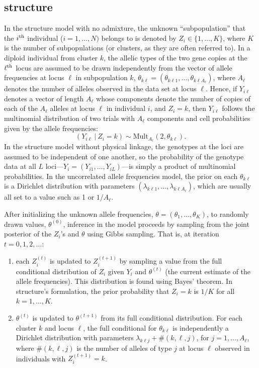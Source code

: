 \subsection*{{\sc structure}}
In the {\sc structure} model with no admixture, the unknown ``subpopulation'' that the 
$i^\mathrm{th}$ individual ($i=1,\ldots,N)$ belongs to is denoted by $Z_i \in \{1,\ldots,K\}$, 
where $K$ is the 
number of subpopulations (or clusters, as they are often referred to).  
In a diploid individual from cluster $k$, the 
allelic types of the two gene copies at the $\ell^\mathrm{th}$ locus are assumed
to be drawn independently from the vector of allele frequencies at
locus $\ell$ in subpopulation $k$,  $\theta_{k\ell}=(\theta_{k\ell 1},\ldots,\theta_{k\ell A_\ell})$, where 
$A_\ell$ 
denotes the number of alleles observed in the data set at locus $\ell$.
Hence, if $Y_{i\ell}$ denotes a vector of length $A_\ell$ whose components denote the 
number
of copies of each of the $A_\ell$ alleles at locus $\ell$ in individual $i$, and 
$Z_i=k$, then $Y_{i\ell}$ follows the multinomial distribution of two trials with
$A_\ell$  components and cell probabilities given by the allele frequencies: 
\begin{equation}
(Y_{i\ell}~|~Z_i=k) \sim \mathrm{Mult}_{A_\ell}(2, \theta_{k\ell}).
\end{equation}
In the {\sc structure} model without physical linkage, the genotypes at the loci are assumed to
be independent of one another, so the probability of the genotype data at
all $L$ loci---$Y_i=(Y_{i1},\ldots,Y_{iL})$---is simply a product of multinomial 
probabilities.
In the uncorrelated allele frequencies model, the prior on each $\theta_{k\ell}$ is a
Dirichlet distribution with parameters $(\lambda_{k\ell1},\ldots,\lambda_{k\ell A_
\ell})$,
which are usually all set to a value such as 1 or $1/A_\ell$.  

After initializing the unknown allele frequencies, $\theta = (\theta_1,\ldots,\theta_K)$, to randomly drawn values,
$\theta^{(0)}$, inference in the model proceeds by sampling from the joint posterior of the 
$Z_i$'s and $\theta$ using Gibbs sampling.  That is,
at iteration $t = 0, 1, 2, \ldots$:
\begin{enumerate}
\item each $Z^{(t)}_i$ is updated to $Z^{(t+1)}_i$ by sampling a value from 
the full conditional distribution of $Z_i$ given
$Y_i$ and $\theta^{(t)}$ (the current estimate of the allele frequencies).  This
distribution is found using Bayes' theorem. In {\sc structure}'s formulation, the 
prior probability that $Z_i=k$ is $1/K$ for all $k=1,\ldots, K$.     
\item $\theta^{(t)}$ is updated to $\theta^{(t+1)}$ from its full conditional distribution.  For each 
cluster
$k$ and locus $\ell$, the full conditional for $\theta_{k\ell}$ is independently a 
Dirichlet distribution with parameters $\lambda_{k\ell j} + \#(k,\ell,j)$, for 
$j=1,\ldots, A_\ell$,
where $\#(k,\ell,j)$ is the number of alleles of type $j$ at locus $\ell$ observed in 
individuals with $Z^{(t+1)}_i = k$.   
\end{enumerate}


